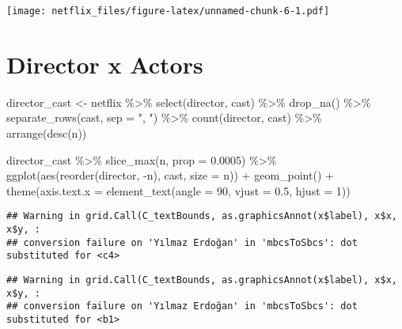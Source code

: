 \documentclass[
]{article}
\newenvironment{Shaded}{\begin{snugshade}}{\end{snugshade}}
\newcommand{\AttributeTok}[1]{\textcolor[rgb]{0.77,0.63,0.00}{#1}}
\newcommand{\DecValTok}[1]{\textcolor[rgb]{0.00,0.00,0.81}{#1}}
\newcommand{\FloatTok}[1]{\textcolor[rgb]{0.00,0.00,0.81}{#1}}
\newcommand{\FunctionTok}[1]{\textcolor[rgb]{0.00,0.00,0.00}{#1}}
\newcommand{\NormalTok}[1]{#1}
\newcommand{\OtherTok}[1]{\textcolor[rgb]{0.56,0.35,0.01}{#1}}
\newcommand{\SpecialCharTok}[1]{\textcolor[rgb]{0.00,0.00,0.00}{#1}}
\newcommand{\StringTok}[1]{\textcolor[rgb]{0.31,0.60,0.02}{#1}}
\begin{document}
\texttt{[image: netflix\_files/figure-latex/unnamed-chunk-6-1.pdf]}

\hypertarget{director-x-actors}{%
\section{Director x Actors}\label{director-x-actors}}

\begin{Shaded}
\begin{Highlighting}[]
\NormalTok{director\_cast }\OtherTok{\textless{}{-}}\NormalTok{ netflix }\SpecialCharTok{\%\textgreater{}\%} 
  \FunctionTok{select}\NormalTok{(director, cast) }\SpecialCharTok{\%\textgreater{}\%} 
  \FunctionTok{drop\_na}\NormalTok{() }\SpecialCharTok{\%\textgreater{}\%} 
  \FunctionTok{separate\_rows}\NormalTok{(cast, }\AttributeTok{sep =} \StringTok{", "}\NormalTok{) }\SpecialCharTok{\%\textgreater{}\%} 
  \FunctionTok{count}\NormalTok{(director, cast) }\SpecialCharTok{\%\textgreater{}\%} 
  \FunctionTok{arrange}\NormalTok{(}\FunctionTok{desc}\NormalTok{(n))}

\NormalTok{director\_cast }\SpecialCharTok{\%\textgreater{}\%} 
  \FunctionTok{slice\_max}\NormalTok{(n, }\AttributeTok{prop =} \FloatTok{0.0005}\NormalTok{) }\SpecialCharTok{\%\textgreater{}\%} 
  \FunctionTok{ggplot}\NormalTok{(}\FunctionTok{aes}\NormalTok{(}\FunctionTok{reorder}\NormalTok{(director, }\SpecialCharTok{{-}}\NormalTok{n), cast, }\AttributeTok{size =}\NormalTok{ n)) }\SpecialCharTok{+}
  \FunctionTok{geom\_point}\NormalTok{() }\SpecialCharTok{+}
  \FunctionTok{theme}\NormalTok{(}\AttributeTok{axis.text.x =} \FunctionTok{element\_text}\NormalTok{(}\AttributeTok{angle =} \DecValTok{90}\NormalTok{, }\AttributeTok{vjust =} \FloatTok{0.5}\NormalTok{, }\AttributeTok{hjust =} \DecValTok{1}\NormalTok{))}
\end{Highlighting}
\end{Shaded}

\begin{verbatim}
## Warning in grid.Call(C_textBounds, as.graphicsAnnot(x$label), x$x, x$y, :
## conversion failure on 'Yılmaz Erdoğan' in 'mbcsToSbcs': dot substituted for <c4>
\end{verbatim}

\begin{verbatim}
## Warning in grid.Call(C_textBounds, as.graphicsAnnot(x$label), x$x, x$y, :
## conversion failure on 'Yılmaz Erdoğan' in 'mbcsToSbcs': dot substituted for <b1>
\end{verbatim}
\end{document}
